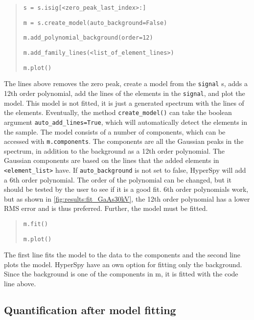 \begin{quote}
    \verb|s = s.isig[<zero_peak_last_index>:]|

    \verb|m = s.create_model(auto_background=False)|

    \verb|m.add_polynomial_background(order=12)|

    \verb|m.add_family_lines(<list_of_element_lines>)|

    \verb|m.plot()|

\end{quote}

The lines above removes the zero peak, create a model from the \verb|signal| s, adds a 12th order polynomial, add the lines of the elements in the \verb|signal|, and plot the model.
This model is not fitted, it is just a generated spectrum with the lines of the elements.
Eventually, the method \verb|create_model()| can take the boolean argument \verb|auto_add_lines=True|, which will automatically detect the elements in the sample.
The model consists of a number of components, which can be accessed with \verb|m.components|.
The components are all the Gaussian peaks in the spectrum, in addition to the background as a 12th order polynomial.
The Gaussian components are based on the lines that the added elements in \verb|<element_list>| have.
If \verb|auto_background| is not set to false, HyperSpy will add a 6th order polynomial.
The order of the polynomial can be changed, but it should be tested by the user to see if it is a good fit.
6th order polynomials work, but as shown in \cref{fig:results:fit_GaAs30kV}, the 12th order polynomial has a lower RMS error and is thus preferred.
Further, the model must be fitted.

\begin{quote}
    \verb|m.fit()|


    \verb|m.plot()|
\end{quote}

The first line fits the model to the data to the components and the second line plots the model.
HyperSpy have an own option for fitting only the background.
Since the background is one of the components in m, it is fitted with the code line above.






\subsection{Quantification after model fitting}
\label{sec:discussion:steps:quantification:model}

